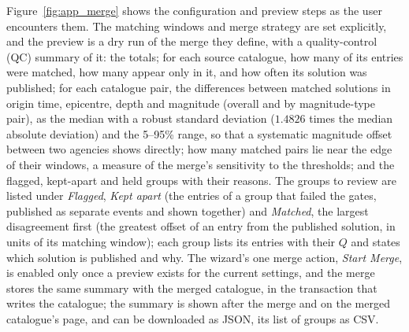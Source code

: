 \documentclass[12pt]{article}
\begin{document}
Figure~\ref{fig:app_merge} shows the configuration and preview steps as the user
encounters them.  The matching windows and merge strategy are set explicitly,
and the preview is a dry run of the merge they define, with a quality-control
(QC) summary of it: the totals; for each source catalogue, how many of its
entries were matched, how many appear only in it, and how often its solution was
published; for each catalogue pair, the differences between matched solutions in
origin time, epicentre, depth and magnitude (overall and by magnitude-type pair),
as the median with a robust standard deviation ($1.4826$ times the median
absolute deviation) and the 5--95\% range, so that a systematic magnitude offset
between two agencies shows directly; how many matched pairs lie near the edge of
their windows, a measure of the merge's sensitivity to the thresholds; and the
flagged, kept-apart and held groups with their reasons.  The groups to review are
listed under \emph{Flagged}, \emph{Kept apart} (the entries of a group that
failed the gates, published as separate events and shown together) and
\emph{Matched}, the largest disagreement first (the greatest offset of an entry
from the published solution, in units of its matching window); each group lists
its entries with their $Q$ and states which solution is published and why.  The
wizard's one merge action, \emph{Start Merge}, is enabled only once a preview
exists for the current settings, and the merge stores the same summary with the
merged catalogue, in the transaction that writes the catalogue; the summary is shown after the merge and on the merged
catalogue's page, and can be downloaded as JSON, its list of groups as CSV.
\end{document}
